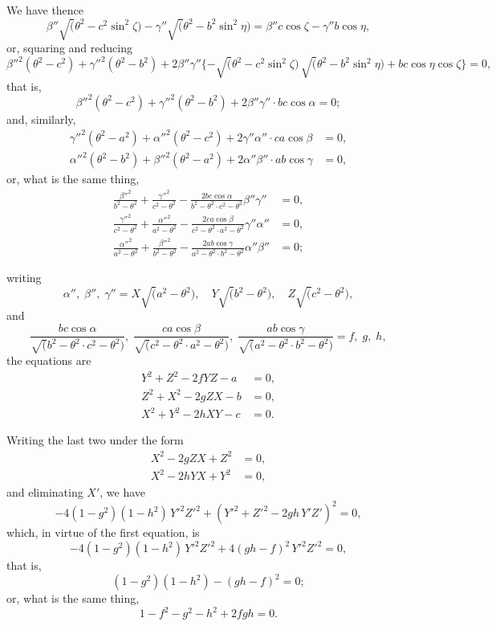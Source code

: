 \documentclass[11pt,a4paper]{book}
\begin{document}
We have thence
\[
\beta''\surd(\theta^2 - c^2\sin^2\zeta) - \gamma''\surd(\theta^2 - b^2\sin^2\eta) = \beta''c\cos\zeta - \gamma''b\cos\eta,
\]
or, squaring and reducing
\[
\beta''^2(\theta^2-c^2) + \gamma''^2(\theta^2-b^2) + 2\beta''\gamma''\{-\surd(\theta^2-c^2\sin^2\zeta)\,\surd(\theta^2-b^2\sin^2\eta) + bc\cos\eta\cos\zeta\} = 0,
\]
that is,
\[
\beta''^2(\theta^2-c^2) + \gamma''^2(\theta^2-b^2) + 2\beta''\gamma'' \cdot bc\cos\alpha = 0;
\]
and, similarly,
\begin{align*}
\gamma''^2(\theta^2-a^2) + \alpha''^2(\theta^2-c^2) + 2\gamma''\alpha'' \cdot ca\cos\beta &= 0,\\
\alpha''^2(\theta^2-b^2) + \beta''^2(\theta^2-a^2) + 2\alpha''\beta'' \cdot ab\cos\gamma &= 0,
\end{align*}
or, what is the same thing,
\begin{align*}
\frac{\beta''^2}{b^2-\theta^2} + \frac{\gamma''^2}{c^2-\theta^2} - \frac{2bc\cos\alpha}{b^2-\theta^2 \cdot c^2-\theta^2}\beta''\gamma'' &= 0,\\
\frac{\gamma''^2}{c^2-\theta^2} + \frac{\alpha''^2}{a^2-\theta^2} - \frac{2ca\cos\beta}{c^2-\theta^2 \cdot a^2-\theta^2}\gamma''\alpha'' &= 0,\\
\frac{\alpha''^2}{a^2-\theta^2} + \frac{\beta''^2}{b^2-\theta^2} - \frac{2ab\cos\gamma}{a^2-\theta^2 \cdot b^2-\theta^2}\alpha''\beta'' &= 0;
\end{align*}

writing
\[
\alpha'',\; \beta'',\; \gamma'' = X\surd(a^2-\theta^2),\quad Y\surd(b^2-\theta^2),\quad Z\surd(c^2-\theta^2),
\]
and
\[
\frac{bc\cos\alpha}{\surd(b^2-\theta^2 \cdot c^2-\theta^2)},\; \frac{ca\cos\beta}{\surd(c^2-\theta^2 \cdot a^2-\theta^2)},\; \frac{ab\cos\gamma}{\surd(a^2-\theta^2 \cdot b^2-\theta^2)} = f,\; g,\; h,
\]
the equations are
\begin{align*}
Y^2 + Z^2 - 2fYZ - a &= 0,\\
Z^2 + X^2 - 2gZX - b &= 0,\\
X^2 + Y^2 - 2hXY - c &= 0.
\end{align*}

Writing the last two under the form
\begin{align*}
X^2 - 2gZX + Z^2 &= 0,\\
X^2 - 2hYX + Y^2 &= 0,
\end{align*}
and eliminating $X'$, we have
\[
-4(1-g^2)(1-h^2)\,Y'^2Z'^2 + (Y'^2 + Z'^2 - 2gh\,Y'Z')^2 = 0,
\]
which, in virtue of the first equation, is
\[
-4(1-g^2)(1-h^2)\,Y'^2Z'^2 + 4(gh-f)^2\,Y'^2Z'^2 = 0,
\]
that is,
\[
(1-g^2)(1-h^2) - (gh-f)^2 = 0;
\]
or, what is the same thing,
\[
1 - f^2 - g^2 - h^2 + 2fgh = 0.
\]
\end{document}
